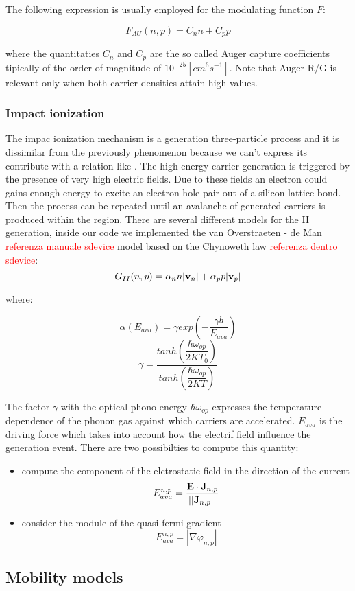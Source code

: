 The following expression is usually employed for the modulating function $F$:

\begin{equation}
F_{AU}(n,p) = C_nn+C_pp
\end{equation}

where the quantitaties $C_n$ and $C_p$ are the so called  Auger capture coefficients tipically of the order of magnitude of $10^{-25}[cm^6s^{-1}]$.
Note that Auger R/G is relevant only when both carrier densities attain high values.


\subsubsection{Impact ionization}

The impac ionization mechanism is a generation three-particle process and it is dissimilar from the previously phenomenon because we can't express its contribute with a relation like . The high energy carrier generation is triggered by the presence of very high electric fields. Due to these fields an electron could gains enough energy to excite an electron-hole pair out of a silicon lattice bond. Then the process can be repeated until an avalanche of generated carriers is produced within the region.
There are several different models for the II generation, inside our code we implemented the van Overstraeten - de Man \textcolor{red}{referenza manuale sdevice} model based on the Chynoweth law \textcolor{red}{referenza dentro sdevice}:
\begin{equation}
G_{II}(n,p)= \alpha_n n |\mathbf{v}_n| + \alpha_p p |\mathbf{v}_p|
\end{equation}

where:

\begin{equation}
\alpha(E_{ava}) = \gamma exp\left(-\dfrac{\gamma b}{E_{ava}} \right)
\end{equation} 
\begin{equation}
\gamma = \dfrac{tanh\left(\dfrac{\hbar \omega_{op}}{2KT_0} \right) }{tanh\left(\dfrac{\hbar \omega_{op}}{2KT} \right)}
\end{equation}

The factor $\gamma$ with the optical phono energy $\hbar \omega_{op}$ expresses the temperature dependence of the phonon gas against which carriers are accelerated.
$E_{ava}$ is the driving force which takes into account how the electrif field influence the generation event. There are two possibilties to compute this quantity:
\begin{itemize}
\item compute the component of the elctrostatic field in the direction of the current
\begin{equation}
E_{ava}^{n,p} = \dfrac{\mathbf{E}\cdot\mathbf{J}_{n,p}}{||\mathbf{J}_{n,p}||}
\end{equation}
\item consider the module of the quasi fermi gradient
\begin{equation}
E_{ava}^{n,p} = |\nabla \varphi_{n,p}|
\end{equation}
\end{itemize}

\subsection{Mobility models}

